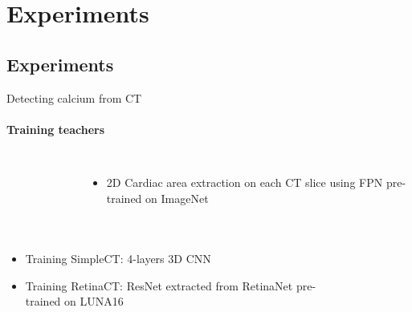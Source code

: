 \documentclass[compress,aspectratio=169,xcolor=table]{beamer}
\begin{document}
\section{Experiments}\subsection{Experiments}


\begin{frame}{Detecting calcium from CT}
	\framesubtitle{Training teachers}
	\begin{columns}[onlytextwidth]
			\begin{figure}
			\end{figure}			
			\begin{itemize}
				\item 2D Cardiac area extraction on each CT slice using FPN pre-trained on ImageNet
			\end{itemize}
	\end{columns}
	\begin{columns}[onlytextwidth]
			\begin{itemize}
				\item Training SimpleCT: 4-layers 3D CNN
				\item Training RetinaCT: ResNet extracted from RetinaNet pre-trained on LUNA16
			\end{itemize}
			\begin{figure}
				\vspace{-3em}

\end{figure}
\end{columns}
\end{frame}
\end{document}
